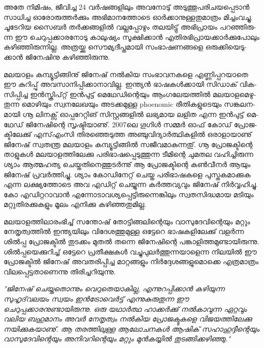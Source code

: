 അ­തേ നി­മി­ഷം, ജീ­വി­ച്ച 24 വര്‍­ഷ­ങ്ങ­ളി­ലും അവ­നോ­ടു് അടു­ത്തു­പ­രി­ച­യ­പ്പെ­ടാന്‍ സാ­ധി­ച്ച ഓരോ­രു­ത്തര്‍­ക്കും അഭി­മാ­ന­ത്തോ­ടെ 
ഓര്‍­ക്കാ­നു­ള്ള­തു­മാ­ത്രം മി­ച്ചം­വ­ച്ചു. ചൂ­ടേ­റിയ സൈ­ബര്‍ തര്‍­ക്ക­ങ്ങ­ളില്‍ വല്ല­പ്പോ­ഴും തല­യി­ട്ടു് അഭി­പ്രാ­യം പറ­ഞ്ഞി­രു­ന്ന ഈ 
ചെ­റു­പ്പ­ക്കാ­ര­നോ­ടു കാ­ലു­ഷ്യം സൂ­ക്ഷി­ക്കാന്‍ എതി­ര­ഭി­പ്രാ­യ­ക്കാര്‍­ക്കു­പോ­ലും കഴി­ഞ്ഞി­രു­ന്നി­ല്ല. അത്ര­യ്ക്കു സൌ­മ്യ­ദീ­പ്ത­മാ­യി 
സം­ഭാ­ഷ­ണ­ങ്ങ­ളെ ഒരു­ക്കി­യെ­ടു­ക്കാന്‍ ജി­നേ­ഷി­നു കഴി­ഞ്ഞി­രു­ന്നു­.

­മ­ല­യാ­ളം കമ്പ്യൂ­ട്ടി­ങ്ങി­നു് ജി­നേ­ഷ് നല്‍­കിയ സം­ഭാ­വ­ന­ക­ളെ എണ്ണി­പ്പ­റ­യാ­തെ ഈ കു­റി­പ്പു് അവ­സാ­നി­പ്പി­ക്കാ­നാ­വി­ല്ല. 
ഇന്ത്യന്‍ ഭാ­ഷ­കള്‍­ക്കാ­യി സി­ഡാ­ക്‍ വി­ക­സി­പ്പി­ച്ച ഇന്‍­സ്ക്രി­പ്റ്റ് ഇന്‍­പു­ട്ട് മെ­ഥേ­ഡി­ന്റെ­യും ആം­ഗ­ലേ­യ­ത്തില്‍ മല­യാ­ള­മെ­ഴു­തു­ന്ന 
മൊ­ഴി­യും സ്വ­ന­ലേ­ഖ­യും അട­ക്ക­മു­ള്ള phoenomic രീ­തി­ക­ളു­ടെ­യും സങ്ക­ല­ന­മാ­യി ഗ്നൂ ലി­ന­ക്സ് ഓപ്പ­റേ­റ്റി­ങ് സി­സ്റ്റ­ങ്ങ­ളില്‍ ലഭ്യ­മായ 
ലളിത എന്ന ഇന്‍­പു­ട്ട് മെ­ഥേ­ഡ് ജി­നേ­ഷി­ന്റെ സൃ­ഷ്ടി­യാ­ണു്. 2007­ലെ ഗൂ­ഗിള്‍ സമ്മര്‍ ഓഫ് കോ­ഡ് പ്രോ­ജ­ക്ടി­ലേ­ക്കു് എസ്എം­സി 
തി­ര­ഞ്ഞെ­ടു­ത്ത അഞ്ചു­വി­ദ്യാര്‍­ത്ഥി­ക­ളില്‍ ഒരാ­ളാ­യാ­ണു് ജി­നേ­ഷ് സ്വ­ത­ന്ത്ര മല­യാ­ളം കമ്പ്യൂ­ട്ടി­ങ്ങില്‍ സജീ­വ­മാ­കു­ന്ന­തു്. ഗ്നൂ 
പ്രോ­ജ­ക്ടി­ന്റെ താ­ളു­കള്‍ മല­യാ­ള­ത്തി­ലേ­ക്കു പരി­ഭാ­ഷ­പ്പെ­ടു­ത്തു­ന്ന ടീ­മി­ന്റെ ചു­മ­തല വഹി­ച്ചി­രു­ന്ന ശ്യാം ആത്മ­ഹ­ത്യ 
ചെ­യ്ത­തി­നെ­ത്തു­ടര്‍­ന്നു് ആ പ്രോ­ജ­ക്ടി­ന്റെ കണ്‍­വീ­നര്‍ ആയും ജി­നേ­ഷ് പ്ര­വര്‍­ത്തി­ച്ചു. ശ്യാം കോ­ഡി­നേ­റ്റ് ചെ­യ്ത പരി­ഭാ­ഷ­ക­ളെ 
പു­സ്ത­ക­മാ­ക്കുക എന്ന ലക്ഷ്യ­ത്തോ­ടെ അവ എഡി­റ്റ് ചെ­യ്യു­ന്ന കര്‍­ത്ത­വ്യ­വും ജി­നേ­ഷ് നിര്‍­വ്വ­ഹി­ച്ചു. കോ എഡി­റ്റ­റാ­വാന്‍ 
എന്നോ­ടാ­വ­ശ്യ­പ്പെ­ട്ടി­രു­ന്നെ­ങ്കി­ലും സ്വ­ത­സി­ദ്ധ­മായ മടി­യും മറ്റു­തി­ര­ക്കു­ക­ളും മൂ­ലം എനി­ക്കു കഴി­ഞ്ഞ­തു­മി­ല്ല.

­മ­ല­യാ­ള­ത്തി­ലാ­രം­ഭി­ച്ച് സന്തോ­ഷ് തോ­ട്ടി­ങ്ങ­ലി­ന്റെ­യും വാ­സു­ദേ­വി­ന്റെ­യും മറ്റും നേ­തൃ­ത്വ­ത്തില്‍ ഇന്ത്യ­യി­ലും വി­ദേ­ശ­ത്തു­മു­ള്ള ഒട്ടേ­റെ 
ഭാ­ഷ­ക­ളി­ലേ­ക്കു് വളര്‍­ന്ന ശില്‍പ്പ പ്രോ­ജ­ക്ടില്‍ തു­ട­ക്കം മു­തല്‍ തന്നെ ജി­നേ­ഷി­ന്റെ പങ്കാ­ളി­ത്ത­മു­ണ്ടാ­യി­രു­ന്നു. ശില്‍­പ്പ­യെ­ക്കു­റി­ച്ച് 
ഒട്ടേ­റെ പ്ര­തീ­ക്ഷ­കള്‍ വച്ചു­പു­ലര്‍­ത്തു­ന്ന­യാ­ളെ­ന്ന നി­ല­യില്‍ ഈ പ്രോ­ജ­ക്ടില്‍ ജി­നേ­ഷ് അവ­ത­രി­പ്പി­ച്ച മാ­റ്റ­ങ്ങ­ളും 
നിര്‍­ദ്ദേ­ശ­ങ്ങ­ളു­മൊ­ക്കെ എത്ര­മാ­ത്രം വി­ല­പ്പെ­ട്ട­താ­ണെ­ന്നു തി­രി­ച്ച­റി­യു­ന്നു­.

\emph{"ജിനേഷ് ചെയ്തതൊന്നും വെറുതെയാകില്ല, എന്നുറപ്പിക്കാന്‍ കഴിയുന്ന സുഹൃദ്‌വലയം സ്വയം ഇന്‍ട്രോവെര്‍ട്ട് 
എന്നുകുരുതുന്ന ഈ ചെറുപ്പക്കാരനുണ്ടായിരുന്നു. ഒരു യഥാര്‍ത്ഥ ഹാക്കര്‍ക്കു് നല്‍കാവുന്ന ഏറ്റവും വലിയ ബഹുമാനം അവര്‍ 
നേതൃത്വം നല്‍കിയ പ്രോജക്ടുകളെ വിജയത്തിലേക്കു നയിക്കുകയാണു്. ആ തരത്തിലുള്ള ആലോചനകള്‍ ആഷിക്‍ 
സഹാഹുദ്ദീന്റെയും വാസുദേവിന്റെയും അനിവറിന്റെയും മറ്റും മുന്‍കയ്യില്‍ തുടങ്ങിക്കഴിഞ്ഞു."}

